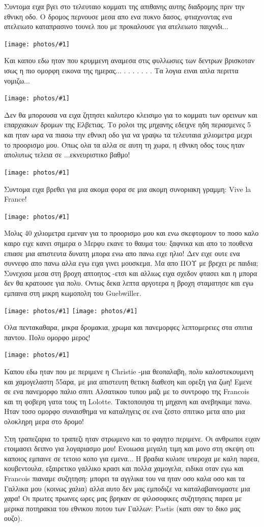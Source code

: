 \documentclass[11pt, letterpaper]{book}
\newcommand\photo[1]{\noindent\texttt{[image: photos/\#1]}}
\begin{document}
Συντομα ειχα βγει στο τελευταιο κομματι της απιθανης αυτης διαδρομης πριν την εθνικη οδο.
Ο δρομος περνουσε μεσα απο ενα πυκνο δασος, φτιαχνοντας ενα ατελειωτο καταπρασινο τουνελ που με προκαλουσε για ατελειωτο παιχνιδι... 

\photo{73.jpg}

Και καπου εδω ηταν που κρυμμενη αναμεσα στις φυλλωσιες των δεντρων βρισκοταν ισως η πιο ομορφη εικονα της ημερας...
.
.
.
.
.
.
.
Τα λογια ειναι απλα περιττα νομιζω...

\photo{74.jpg}

Δεν θα μπορουσα να ειχα ζητησει καλυτερο κλεισιμο για το κομματι των ορεινων και επαρχιακων δρομων της Ελβετιας.
Το ρολοι της μηχανης εδειχνε ηδη περασμενες 5 και ηταν ωρα να πιασω την εθνικη οδο για να γραψω τα τελευταια χιλιομετρα μεχρι το προορισμο μου. Οπως ολα τα αλλα σε αυτη τη χωρα, η εθνικη οδος τους ηταν απολυτως τελεια σε ...εκνευριστικο βαθμο!

\photo{75.jpg}

Συντομα ειχα βρεθει για μια ακομα φορα σε μια ακομη συνοριακη γραμμη: Vive la France!

\photo{76.jpg}

Μολις 40 χιλιομετρα εμεναν για το προορισμο μου και ενω σκεφτομουν το ποσο καλο καιρο ειχε κανει σημερα ο Μερφυ εκανε το θαυμα του: ξαφνικα και απο το πουθενα επιασε μια απιστευτα δυνατη μπορα ενω απο πανω ειχε ηλιο! Δεν ειχε ουτε ενα συννεφο απο πανω αλλα εγω ειχα γινει μουσκεμα. Μα απο ΠΟΥ με βρεχει ρε παιδια;
Συνεχισα μεσα στη βροχη απτοητος -ετσι και αλλιως ειχα σχεδον φτασει και η μπορα δεν θα κρατουσε για πολυ.
Οντως δεκα λεπτα αργοτερα η βροχη σταματησε και εγω εμπαινα στη μικρη κωμοπολη του Guebwiller.

\photo{77.jpg}
\photo{78.jpg}

Ολα πεντακαθαρα, μικρα δρομακια, χρωμα και πανεμορφες λεπτομερειες στα σπιτια παντου. 
Πολυ ομορφο μερος!

\photo{79.jpg}

Καπου εδω ηταν που με περιμενε η Christie -μια θεοπαλαβη, πολυ καλοστεκουμενη και χαμογελαστη 55αρα, με μια απιστευτη θετικη διαθεση και ορεξη για ζωη! Εμενε σε ενα πανεμορφο παλιο σπιτι Αλσατικου τυπου μαζι με το συντροφο της Francois και τη φοβερη γατα τους τη Lolotte.
Τακτοποιησα τη μηχανη και ανεβηκαμε πανω. Ηταν τοσο ομορφο συναισθημα να καταληγεις σε ενα ζεστο σπιτικο μετα απο μια ολοκληρη μερα στο δρομο!

Στη τραπεζαρια το τραπεζι ηταν στρωμενο και το φαγητο περιμενε. Οι ανθρωποι ειχαν ετοιμασει δειπνο για λογαριασμο μου! Ενοιωσα μεγαλη τιμη και μονο στη σκεψη οτι καποιος εμπαινε σε τετοιο κοπο για εμενα...
Η βραδια κυλισε υπεροχα με καλη παρεα, κουβεντουλα, εξαιρετικο γαλλικο κρασι και πολλα χαμογελα, ειδικα οταν εγω και Francois πιαναμε συζητηση: μπορει τα αγγλικα του να ηταν οσο καλα οσο και τα Γαλλικα μου (κοινως χαλια) αλλα αυτο δεν μας εμποδιζε να καταλαβαινομαστε μια χαρα! 
Οι πρωτες πρωινες ωρες μας βρηκαν σε φιλοσοφικες συζητησεις παρεα με μερικα ποτηρακια του εθνικου ποτου των Γαλλων: Pastis (κατι σαν το δικο μας ουζο).
\end{document}
